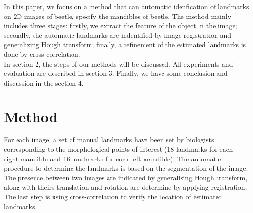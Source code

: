 \documentclass[twoside,twocolumn,10pt]{article}
\begin{document}
In this paper, we focus on a method that can automatic idenfication of landmarks on 2D images of beetle, specify the mandibles of beetle. The method mainly includes three stages: firstly, we extract the feature of the object in the image; secondly, the automatic landmarks are indentified by image registration and generalizing Hough transform; finally, a refinement of the estimated landmarks is done by cross-correlation.\\[0.2cm]
In section 2, the steps of our methods will be discussed. All experiments and evaluation are described in section 3. Finally, we have some conclusion and discussion in the section 4.

\section{Method}
For each image, a set of manual landmarks have been set by biologists corresponding to the morphological points of interest (18 landmarks for each right mandible and 16 landmarks for each left mandible). The automatic procedure to determine the landmarks is based on the segmentation of the image. The presence between two images are indicated by generalizing Hough transform, along with theirs translation and rotation are determine by applying registration. The last step is using cross-correlation to verify the location of estimated landmarks.
\end{document}
